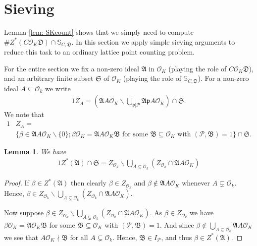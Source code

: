 \documentclass[11pt]{amsart}
\newtheorem{lemma}{Lemma}[section]
\numberwithin{equation}{eqncounter}
\def\IS{\mathbb S}
\def\Pc{\mathcal{P}}
\def\p{\mathfrak{p}}
\def\B{\mathfrak{B}}
\def\A{\mathfrak{A}}
\def\D{\mathfrak{D}}
\def\Zstar{Z^*}
\def\Z{Z}
\def\Sa{\mathfrak{S}}
\def\Oseen{{\mathcal{O}}}
\begin{document}
 
 
 
 
 
 
\section{Sieving}\label{sec: sieving}
Lemma \ref{lem: SKcount} shows that  we simply need to compute $\#\Zstar(C\Oseen_K\D)\cap \IS_{C,\D}$.  
In this section we apply simple sieving arguments to reduce this task to an ordinary lattice point counting problem.

For the entire section we fix a non-zero ideal $\A$ in $\Oseen_K$ (playing the role of $C\Oseen_K\D$),
and an arbitrary finite subset  $\Sa$ of $\Oseen_K$  (playing the role of $\IS_{C,\D}$).
For a  non-zero ideal  $A\subseteq \Oseen_k$ we write
\begin{alignat*}1
\Z_A=\left(\A A\Oseen_K\backslash \bigcup_{\p|\Pc}\A\p A\Oseen_K\right)\cap \Sa.
\end{alignat*}
We note that 
\begin{alignat*}1
&\Z_A=\\
&\{\beta\in \A A\Oseen_K\backslash \{0\}; \beta\Oseen_K=\A A\Oseen_K\B \text{ for some $\B\subseteq \Oseen_K$ with }(\Pc,\B)=1\}
\cap \Sa.
\end{alignat*}

\begin{lemma}\label{lem: Zstarbasic}
We have 
\begin{alignat*}1
\Zstar(\A)\cap \Sa=\Z_{\Oseen_k}\backslash \bigcup_{A\subsetneq \Oseen_k}(\Z_{\Oseen_k}\cap \A A\Oseen_K)
\end{alignat*}
\end{lemma}
\begin{proof}
If $\beta\in \Zstar(\A)$ then clearly $\beta\in \Z_{\Oseen_k}$ and $\beta \notin \A A\Oseen_K$ whenever $A\subsetneq \Oseen_k$.
Hence, $\beta\in \Z_{\Oseen_k}\backslash \bigcup_{A\subsetneq \Oseen_k}(\Z_{\Oseen_k}\cap \A A\Oseen_K)$. 

Now suppose $\beta \in \Z_{\Oseen_k}\backslash \bigcup_{A\subsetneq \Oseen_k}(\Z_{\Oseen_k}\cap \A A\Oseen_K)$.
As  $\beta \in \Z_{\Oseen_k}$ we have  $\beta\Oseen_K=\A \Oseen_K\B$  for some $\B\subseteq \Oseen_K$ with $(\Pc,\B)=1$.
And since $\beta \notin \bigcup_{A\subsetneq \Oseen_k} \A A\Oseen_K$ we see that 
$A\Oseen_K\nmid \B \text{ for all }A\subsetneq \Oseen_k$. Hence, $\B\in I_\Pc$, and thus $\beta \in \Zstar(\A)$.
\end{proof}
\end{document}
